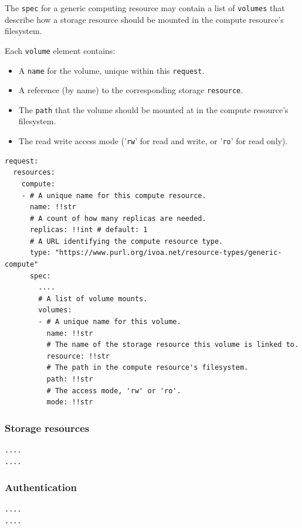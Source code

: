 \documentclass[11pt,a4paper]{ivoa}
\newcommand{\codeword}[1] {\texttt{#1}}
\begin{document}
The \codeword{spec} for a generic computing resource may contain
a list of \codeword{volumes} that describe how a storage resource
should be mounted in the compute resource's filesystem.

\hfill \break
Each \codeword{volume} element contains:
\begin{itemize}
    \item A \codeword{name} for the volume, unique within this \codeword{request}.
    \item A reference (by name) to the corresponding storage \codeword{resource}.
    \item The \codeword{path} that the volume should be mounted at in the compute resource's filesystem.
    \item The read write access mode ('\codeword{rw}' for read and write, or '\codeword{ro}' for read only).
\end{itemize}

\begin{lstlisting}[]
request:
  resources:
    compute:
    - # A unique name for this compute resource.
      name: !!str
      # A count of how many replicas are needed.
      replicas: !!int # default: 1
      # A URL identifying the compute resource type.
      type: "https://www.purl.org/ivoa.net/resource-types/generic-compute"
      spec:
        ....
        # A list of volume mounts.
        volumes:
        - # A unique name for this volume.
          name: !!str
          # The name of the storage resource this volume is linked to.
          resource: !!str
          # The path in the compute resource's filesystem.
          path: !!str
          # The access mode, 'rw' or 'ro'.
          mode: !!str
\end{lstlisting}

\subsubsection{Storage resources}
\label{datamodel-storage-resources}

\begin{lstlisting}[]
....
....
\end{lstlisting}

\subsubsection{Authentication}
\label{datamodel-authentication}

\begin{lstlisting}[]
....
....
\end{lstlisting}
\end{document}
